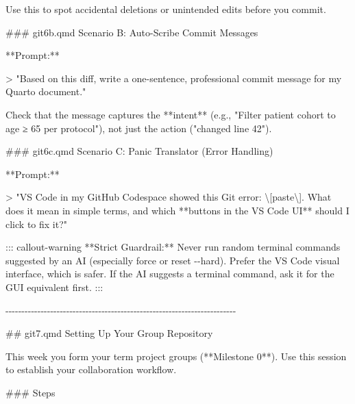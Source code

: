 \documentclass[
  letterpaper,
  DIV=11,
  numbers=noendperiod,
  oneside]{scrreprt}
\newenvironment{Shaded}{\begin{snugshade}}{\end{snugshade}}
\newcommand{\AttributeTok}[1]{\textcolor[rgb]{0.40,0.45,0.13}{#1}}
\newcommand{\FunctionTok}[1]{\textcolor[rgb]{0.28,0.35,0.67}{#1}}
\newcommand{\InformationTok}[1]{\textcolor[rgb]{0.37,0.37,0.37}{#1}}
\newcommand{\NormalTok}[1]{\textcolor[rgb]{0.00,0.23,0.31}{#1}}
\newcommand{\SpecialCharTok}[1]{\textcolor[rgb]{0.37,0.37,0.37}{#1}}
\begin{document}
\begin{Shaded}
\begin{Highlighting}[numbers=left,,]
\NormalTok{Use this to spot accidental deletions or unintended edits before you commit.}

\FunctionTok{\#\#\# \textasciigrave{}git6b.qmd\textasciigrave{} Scenario B: Auto{-}Scribe Commit Messages}

\NormalTok{**Prompt:**}

\AttributeTok{\textgreater{} "Based on this diff, write a one{-}sentence, professional commit message for my Quarto document."}

\NormalTok{Check that the message captures the **intent** (e.g., }\InformationTok{\textasciigrave{}"Filter patient cohort to age ≥ 65 per protocol"\textasciigrave{}}\NormalTok{), not just the action (}\InformationTok{\textasciigrave{}"changed line 42"\textasciigrave{}}\NormalTok{).}

\FunctionTok{\#\#\# \textasciigrave{}git6c.qmd\textasciigrave{} Scenario C: Panic Translator (Error Handling)}

\NormalTok{**Prompt:**}

\AttributeTok{\textgreater{} "VS Code in my GitHub Codespace showed this Git error: }\SpecialCharTok{\textbackslash{}[}\AttributeTok{paste}\SpecialCharTok{\textbackslash{}]}\AttributeTok{. What does it mean in simple terms, and which **buttons in the VS Code UI** should I click to fix it?"}

\NormalTok{::: callout{-}warning}
\NormalTok{**Strict Guardrail:** Never run random terminal commands suggested by an AI (especially }\InformationTok{\textasciigrave{}{-}{-}force\textasciigrave{}}\NormalTok{ or }\InformationTok{\textasciigrave{}reset {-}{-}hard\textasciigrave{}}\NormalTok{). Prefer the VS Code visual interface, which is safer. If the AI suggests a terminal command, ask it for the GUI equivalent first.}
\NormalTok{:::}

\NormalTok{{-}{-}{-}{-}{-}{-}{-}{-}{-}{-}{-}{-}{-}{-}{-}{-}{-}{-}{-}{-}{-}{-}{-}{-}{-}{-}{-}{-}{-}{-}{-}{-}{-}{-}{-}{-}{-}{-}{-}{-}{-}{-}{-}{-}{-}{-}{-}{-}{-}{-}{-}{-}{-}{-}{-}{-}{-}{-}{-}{-}{-}{-}{-}{-}{-}{-}{-}{-}{-}{-}{-}{-}}

\FunctionTok{\#\# \textasciigrave{}git7.qmd\textasciigrave{} Setting Up Your Group Repository}

\NormalTok{This week you form your term project groups (**Milestone 0**). Use this session to establish your collaboration workflow.}

\FunctionTok{\#\#\# Steps}


\end{Highlighting}
\end{Shaded}
\end{document}
